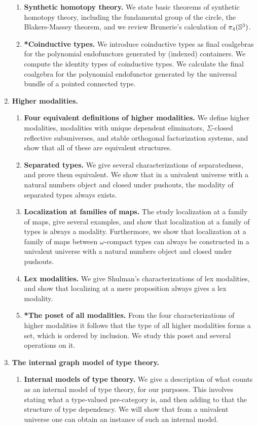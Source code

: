 \documentclass[reqno]{amsart}
\begin{document}
\begin{enumerate}[label=\arabic*.]
\begin{enumerate}[label*=\arabic*.]
\item \textbf{Synthetic homotopy theory.} We state basic theorems of synthetic homotopy theory, including the fundamental group of the circle, the Blakers-Massey theorem, and we review Brunerie's calculation of $\pi_4(\mathbb{S}^{3})$. 
\item \textbf{*Coinductive types.} We introduce coinductive types as final coalgebras for the polynomial endofunctors generated by (indexed) containers. We compute the identity types of coinductive types. We calculate the final coalgebra for the polynomial endofunctor generated by the universal bundle of a pointed connected type.
\end{enumerate}
\item \textbf{Higher modalities.}
\begin{enumerate}[label*=\arabic*.]
\item \textbf{Four equivalent definitions of higher modalities.} We define higher modalities, modalities with unique dependent eliminators, $\Sigma$-closed reflective subuniverses, and stable orthogonal factorization systems, and show that all of these are equivalent structures.
\item \textbf{Separated types.} We give several characterizations of separatedness, and prove them equivalent. We show that in a univalent universe with a natural numbers object and closed under pushouts, the modality of separated types always exists.
\item \textbf{Localization at families of maps.} The study localization at a family of maps, give several examples, and show that localization at a family of types is always a modality. Furthermore, we show that localization at a family of maps between $\omega$-compact types can always be constructed in a univalent universe with a natural numbers object and closed under pushouts.
\item \textbf{Lex modalities.} We give Shulman's characterizations of lex modalities, and show that localizing at a mere proposition always gives a lex modality.
\item \textbf{*The poset of all modalities.} From the four characterizations of higher modalities it follows that the type of all higher modalities forms a set, which is ordered by inclusion. We study this poset and several operations on it.
\end{enumerate}
\item \textbf{The internal graph model of type theory.}
\begin{enumerate}[label*=\arabic*.]
\item \textbf{Internal models of type theory.} We give a description of what counts as an internal model of type theory, for our purposes. This involves stating what a type-valued pre-category is, and then adding to that the structure of type dependency. We will show that from a univalent universe one can obtain an instance of such an internal model.

\end{enumerate}
\end{enumerate}
\end{document}
